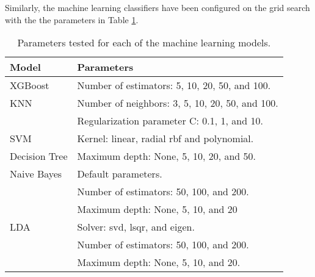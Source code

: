 Similarly, the machine learning classifiers have been configured on the grid search with the the parameters in Table \ref{tab:models}.


\begin{table}[!ht]
    \centering
    \begin{tabular}{lp{11cm}}
        \toprule
        Model                                                                   & Parameters                                      \\
        \midrule
        XGBoost \cite{xgboost}                                                  & Number of estimators: 5, 10, 20, 50, and 100.   \\[2mm]
        \rowcolor{lightgray} KNN \cite{knn}                                     & Number of neighbors: 3, 5, 10, 20, 50, and 100. \\[2mm]
                                                                                & Regularization parameter C: 0.1, 1, and 10.     \\
        \multirow{-2}{*}{SVM \cite{svm}}                                        & Kernel: linear, radial rbf and polynomial.      \\[2mm]
        \rowcolor{lightgray} Decision Tree                                      & Maximum depth: None, 5, 10, 20, and 50.         \\[2mm]
        Naive Bayes                                                             & Default parameters.                             \\[2mm]
        \rowcolor{lightgray}                                                    & Number of estimators: 50, 100, and 200.         \\
        \rowcolor{lightgray}\multirow{-2}{*}{Random Forest \cite{randomforest}} & Maximum depth: None, 5, 10, and 20              \\[2mm]
        LDA \cite{lda}                                                          & Solver: svd, lsqr, and eigen.                   \\[2mm]
        \rowcolor{lightgray}                                                    & Number of estimators: 50, 100, and 200.         \\
        \rowcolor{lightgray}\multirow{-2}{*}{AdaBoost \cite{adaboost}}          & Maximum depth: None, 5, 10, and 20.             \\[2mm]
        \bottomrule
    \end{tabular}
    \caption{Parameters tested for each of the machine learning models.}
    \label{tab:models}
\end{table}

